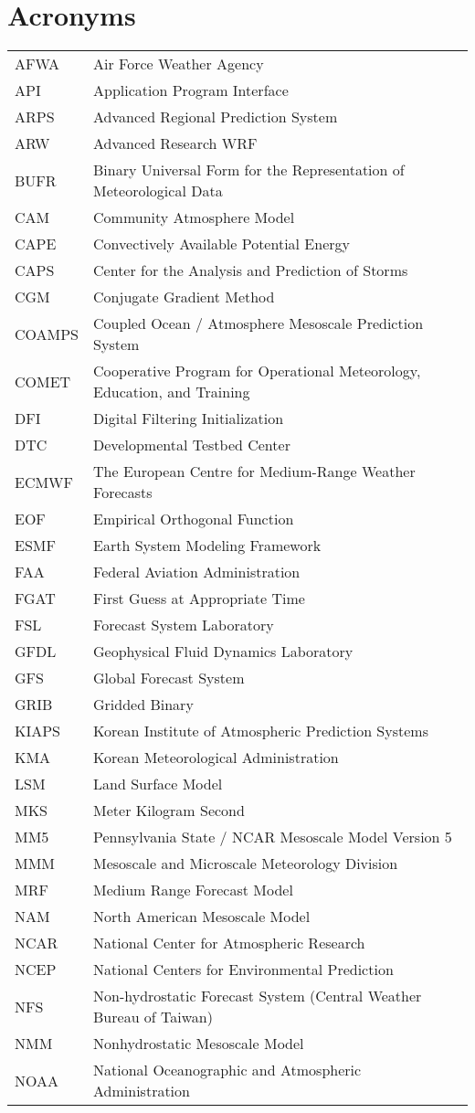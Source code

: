 \chapter{Acronyms}

\begin{tabular}[t]{ll}
AFWA & Air Force Weather Agency \\
API & Application Program Interface \\
ARPS & Advanced Regional Prediction System \\
ARW & Advanced Research WRF \\
BUFR & Binary Universal Form for the Representation of Meteorological Data \\
CAM & Community Atmosphere Model \\
CAPE & Convectively Available Potential Energy \\
CAPS & Center for the Analysis and Prediction of Storms \\
CGM & Conjugate Gradient Method \\
COAMPS & Coupled Ocean / Atmosphere Mesoscale Prediction System \\
COMET & Cooperative Program for Operational Meteorology, Education, and Training \\
DFI & Digital Filtering Initialization \\
DTC & Developmental Testbed Center \\
ECMWF & The European Centre for Medium-Range Weather Forecasts \\
EOF & Empirical Orthogonal Function \\
ESMF & Earth System Modeling Framework \\
FAA & Federal Aviation Administration \\
FGAT & First Guess at Appropriate Time \\
FSL & Forecast System Laboratory \\
GFDL & Geophysical Fluid Dynamics Laboratory \\
GFS & Global Forecast System \\
GRIB & Gridded Binary \\
KIAPS & Korean Institute of Atmospheric Prediction Systems \\
KMA & Korean Meteorological Administration \\
LSM & Land Surface Model \\
MKS & Meter Kilogram Second \\
MM5 & Pennsylvania State / NCAR Mesoscale Model Version 5 \\
MMM & Mesoscale and Microscale Meteorology Division \\
MRF & Medium Range Forecast Model \\
NAM & North American Mesoscale Model \\
NCAR & National Center for Atmospheric Research \\
NCEP & National Centers for Environmental Prediction \\
NFS & Non-hydrostatic Forecast System (Central Weather Bureau of Taiwan) \\
NMM & Nonhydrostatic Mesoscale Model \\
NOAA & National Oceanographic and Atmospheric Administration \\
\end{tabular}
